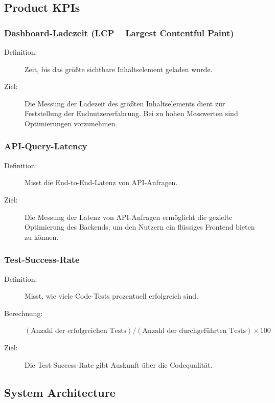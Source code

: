 \documentclass{article}
\begin{document}
\pagebreak
\subsection{Product KPIs}

\subsubsection{Dashboard-Ladezeit (LCP – Largest Contentful Paint)}
\begin{description}
  \item[Definition:] Zeit, bis das größte sichtbare Inhaltselement geladen wurde.
  \item[Ziel:] Die Messung der Ladezeit des größten Inhaltselements dient zur Feststellung der Endnutzererfahrung. Bei zu hohen Messwerten sind Optimierungen vorzunehmen.
\end{description}

\subsubsection{API-Query-Latency}
\begin{description}
  \item[Definition:] Misst die End-to-End-Latenz von API-Anfragen.
  \item[Ziel:] Die Messung der Latenz von API-Anfragen ermöglicht die gezielte Optimierung des Backends, um den Nutzern ein flüssiges Frontend bieten zu können.
\end{description}

\subsubsection{Test-Success-Rate}
\begin{description}
  \item[Definition:] Misst, wie viele Code-Tests prozentuell erfolgreich sind.
  \item[Berechnung:] \((\text{Anzahl der erfolgreichen Tests}) / (\text{Anzahl der durchgeführten Tests}) \times 100\,\)
  \item[Ziel:] Die Test-Success-Rate gibt Auskunft über die Codequalität.
\end{description}




\subsection{System Architecture}
\end{document}
